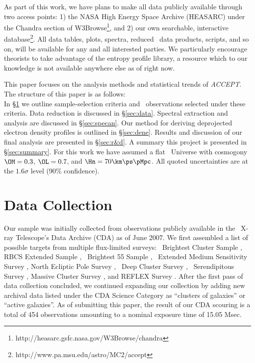 \documentclass[12pt, preprint]{aastex}
\newcommand{\accept}{\textit{ACCEPT}}
\begin{document}
As part of this work, we have plans to make all data publicly available
through two access points: 1) the NASA High Energy Space Archive
(HEASARC) under the Chandra section of
W3Browse\footnote{http://heasarc.gsfc.nasa.gov/W3Browse/chandra}, and
2) our own searchable, interactive
database\footnote{http://www.pa.msu.edu/astro/MC2/accept}. All data
tables, plots, spectra, reduced \Chandra\ data products, scripts, and
so on, will be available for any and all interested parties. We
particularly encourage theorists to take advantage of the entropy
profile library, a resource which to our knowledge is not available
anywhere else as of right now.

This paper focuses on the analysis methods and statistical trends of
\accept. The structure of this paper is as follows:\\
In \S\ref{sec:sample} we outline sample-selection criteria and
\Chandra\ observations selected under these criteria. Data reduction
is discussed in \S\ref{sec:data}. Spectral extraction and analysis are
discussed in \S\ref{sec:specan}. Our method for deriving deprojected
electron density profiles is outlined in \S\ref{sec:dene}. Results and
discussion of our final analysis are presented in \S\ref{sec:r&d}. A
summary this project is presented in \S\ref{sec:summary}. For this
work we have assumed a flat \LCDM\ Universe with cosmogony $\OM=0.3$,
$\OL=0.7$, and $\Hn=70\km\ps\pMpc$. All quoted uncertainties are at
the $1.6\sigma$ level (90\% confidence).

\section{Data Collection}
\label{sec:sample}

Our sample was initially collected from observations publicly
available in the \Chandra\ X-ray Telescope's Data Archive (CDA) as of
June 2007. We first assembled a list of possible targets from multiple
flux-limited surveys: \Rosat\ Brightest Cluster Sample
\citep{1998MNRAS.301..881E}, RBCS Extended Sample
\citep{2000MNRAS.318..333E}, \Rosat\ Brightest 55 Sample
\citep{1990MNRAS.245..559E, 1998MNRAS.298..416P}, \Einstein\ Extended
Medium Sensitivity Survey \citep{1990ApJS...72..567G}, North Ecliptic
Pole Survey \citep{2006ApJS..162..304H}, \Rosat\ Deep Cluster Survey
\citep{1995ApJ...445L..11R}, \Rosat\ Serendipitous Survey
\citep{1998ApJ...502..558V}, Massive Cluster Survey
\citep{2001ApJ...553..668E}, and REFLEX Survey
\citep{2004A&A...425..367B}. After the first pass of data collection
concluded, we continued expanding our collection by adding new archival
data listed under the CDA Science Category as ``clusters of galaxies''
or ``active galaxies''. As of submitting this paper, the result of our
CDA scouring is a total of 454 observations amounting to a nominal
exposure time of 15.05 Msec. 
\end{document}
